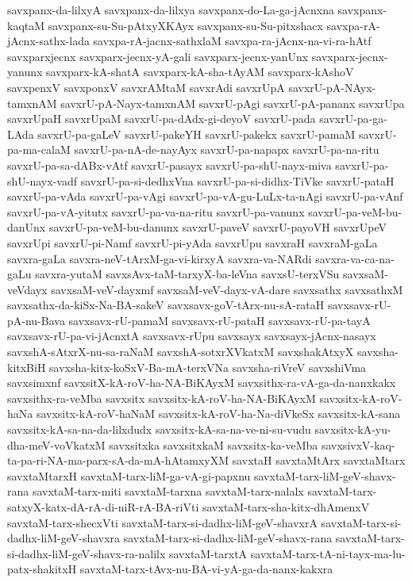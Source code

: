 {savxpanx-da-lilxyA
savxpanx-da-lilxya
savxpanx-do-La-ga-jAcnxna
savxpanx-kaqtaM
savxpanx-su-Su-pAtxyXKAyx
savxpanx-su-Su-pitxshacx
savxpa-rA-jAcnx-sathx-lada
savxpa-rA-jacnx-sathxlaM
savxpa-ra-jAcnx-na-vi-ra-hAtf
savxparxjecnx
savxparx-jecnx-yA-gali
savxparx-jecnx-yanUnx
savxparx-jecnx-yanunx
savxparx-kA-shatA
savxparx-kA-sha-tAyAM
savxparx-kAshoV
savxpenxV
savxponxV
savxrAMtaM
savxrAdi
savxrUpA
savxrU-pA-NAyx-tamxnAM
savxrU-pA-Nayx-tamxnAM
savxrU-pAgi
savxrU-pA-pananx
savxrUpa
savxrUpaH
savxrUpaM
savxrU-pa-dAdx-gi-deyoV
savxrU-pada
savxrU-pa-ga-LAda
savxrU-pa-gaLeV
savxrU-pakeYH
savxrU-pakekx
savxrU-pamaM
savxrU-pa-ma-calaM
savxrU-pa-nA-de-nayAyx
savxrU-pa-napapx
savxrU-pa-na-ritu
savxrU-pa-sa-dABx-vAtf
savxrU-pasayx
savxrU-pa-shU-nayx-miva
savxrU-pa-shU-nayx-vadf
savxrU-pa-si-dedhxVna
savxrU-pa-si-didhx-TiVke
savxrU-pataH
savxrU-pa-vAda
savxrU-pa-vAgi
savxrU-pa-vA-gu-LuLx-ta-nAgi
savxrU-pa-vAnf
savxrU-pa-vA-yitutx
savxrU-pa-va-na-ritu
savxrU-pa-vanunx
savxrU-pa-veM-bu-danUnx
savxrU-pa-veM-bu-danunx
savxrU-paveV
savxrU-payoVH
savxrUpeV
savxrUpi
savxrU-pi-Namf
savxrU-pi-yAda
savxrUpu
savxraH
savxraM-gaLa
savxra-gaLa
savxra-neV-tArxM-ga-vi-kirxyA
savxra-va-NARdi
savxra-va-ca-na-gaLu
savxra-yutaM
savxsAvx-taM-tarxyX-ba-leVna
savxsU-terxVSu
savxsaM-veVdayx
savxsaM-veV-dayxmf
savxsaM-veV-dayx-vA-dare
savxsathx
savxsathxM
savxsathx-da-kiSx-Na-BA-sakeV
savxsavx-goV-tArx-nu-sA-rataH
savxsavx-rU-pA-nu-Bava
savxsavx-rU-pamaM
savxsavx-rU-pataH
savxsavx-rU-pa-tayA
savxsavx-rU-pa-vi-jAcnxtA
savxsavx-rUpu
savxsayx
savxsayx-jAcnx-nasayx
savxshA-sAtxrX-nu-sa-raNaM
savxshA-sotxrXVkatxM
savxshakAtxyX
savxsha-kitxBiH
savxsha-kitx-koSxV-Ba-mA-terxVNa
savxsha-riVreV
savxshiVma
savxsimxnf
savxsitX-kA-roV-ha-NA-BiKAyxM
savxsithx-ra-vA-ga-da-nanxkakx
savxsithx-ra-veMba
savxsitx
savxsitx-kA-roV-ha-NA-BiKAyxM
savxsitx-kA-roV-haNa
savxsitx-kA-roV-haNaM
savxsitx-kA-roV-ha-Na-diVkeSx
savxsitx-kA-sana
savxsitx-kA-sa-na-da-lilxdudx
savxsitx-kA-sa-na-ve-ni-su-vudu
savxsitx-kA-yu-dha-meV-voVkatxM
savxsitxka
savxsitxkaM
savxsitx-ka-veMba
savxsivxV-kaq-ta-pa-ri-NA-ma-parx-sA-da-mA-hAtamxyXM
savxtaH
savxtaMtArx
savxtaMtarx
savxtaMtarxH
savxtaM-tarx-liM-ga-vA-gi-papxnu
savxtaM-tarx-liM-geV-shavx-rana
savxtaM-tarx-miti
savxtaM-tarxna
savxtaM-tarx-nalalx
savxtaM-tarx-satxyX-katx-dA-rA-di-niR-rA-BA-riVti
savxtaM-tarx-sha-kitx-dhAmenxV
savxtaM-tarx-shecxVti
savxtaM-tarx-si-dadhx-liM-geV-shavxrA
savxtaM-tarx-si-dadhx-liM-geV-shavxra
savxtaM-tarx-si-dadhx-liM-geV-shavx-rana
savxtaM-tarx-si-dadhx-liM-geV-shavx-ra-nalilx
savxtaM-tarxtA
savxtaM-tarx-tA-ni-tayx-ma-lu-patx-shakitxH
savxtaM-tarx-tAvx-nu-BA-vi-yA-ga-da-nanx-kakxra
}
